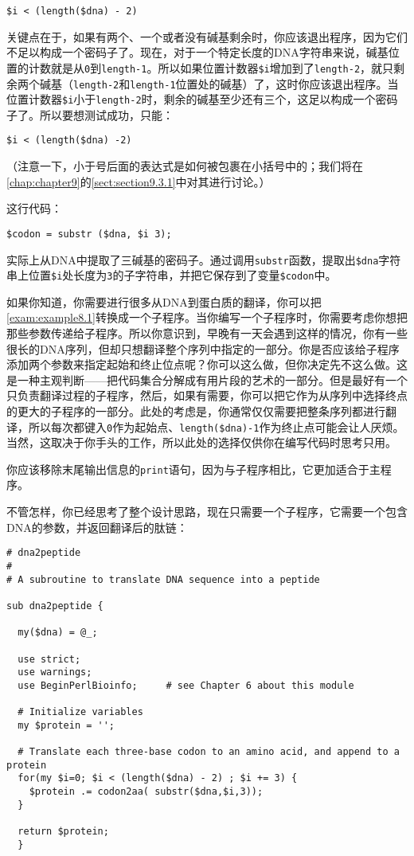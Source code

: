 \begin{lstlisting}
$i < (length($dna) - 2)
\end{lstlisting}

关键点在于，如果有两个、一个或者没有碱基剩余时，你应该退出程序，因为它们不足以构成一个密码子了。现在，对于一个特定长度的DNA字符串来说，碱基位置的计数就是从\verb|0|到\verb|length-1|。所以如果位置计数器\verb|$i|增加到了\verb|length-2|，就只剩余两个碱基（\verb|length-2|和\verb|length-1|位置处的碱基）了，这时你应该退出程序。当位置计数器\verb|$i|小于\verb|length-2|时，剩余的碱基至少还有三个，这足以构成一个密码子了。所以要想测试成功，只能：

\begin{lstlisting}
$i < (length($dna) -2)
\end{lstlisting}

（注意一下，小于号后面的表达式是如何被包裹在小括号中的；我们将在\autoref{chap:chapter9}的\autoref{sect:section9.3.1}中对其进行讨论。）

这行代码：

\begin{lstlisting}
$codon = substr ($dna, $i 3);
\end{lstlisting}

实际上从DNA中提取了三碱基的密码子。通过调用\verb|substr|函数，提取出\verb|$dna|字符串上位置\verb|$i|处长度为\verb|3|的子字符串，并把它保存到了变量\verb|$codon|中。

如果你知道，你需要进行很多从DNA到蛋白质的翻译，你可以把\autoref{exam:example8.1}转换成一个子程序。当你编写一个子程序时，你需要考虑你想把那些参数传递给子程序。所以你意识到，早晚有一天会遇到这样的情况，你有一些很长的DNA序列，但却只想翻译整个序列中指定的一部分。你是否应该给子程序添加两个参数来指定起始和终止位点呢？你可以这么做，但你决定先不这么做。这是一种主观判断——把代码集合分解成有用片段的艺术的一部分。但是最好有一个只负责翻译过程的子程序，然后，如果有需要，你可以把它作为从序列中选择终点的更大的子程序的一部分。此处的考虑是，你通常仅仅需要把整条序列都进行翻译，所以每次都键入\verb|0|作为起始点、\verb|length($dna)-1|作为终止点可能会让人厌烦。当然，这取决于你手头的工作，所以此处的选择仅供你在编写代码时思考只用。

你应该移除末尾输出信息的\verb|print|语句，因为与子程序相比，它更加适合于主程序。

不管怎样，你已经思考了整个设计思路，现在只需要一个子程序，它需要一个包含DNA的参数，并返回翻译后的肽链：

\begin{lstlisting}
# dna2peptide 
#
# A subroutine to translate DNA sequence into a peptide

sub dna2peptide {
  
  my($dna) = @_;

  use strict;
  use warnings;
  use BeginPerlBioinfo;     # see Chapter 6 about this module

  # Initialize variables
  my $protein = '';

  # Translate each three-base codon to an amino acid, and append to a protein 
  for(my $i=0; $i < (length($dna) - 2) ; $i += 3) {
    $protein .= codon2aa( substr($dna,$i,3));
  }

  return $protein;
  }
\end{lstlisting}

